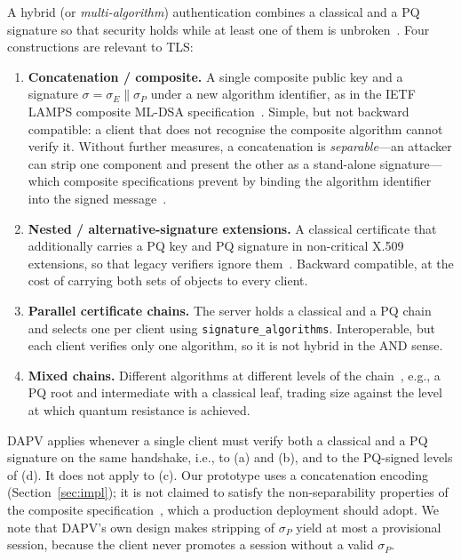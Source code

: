 \documentclass[preprint,10pt,3p]{elsarticle}
\begin{document}
A hybrid (or \emph{multi-algorithm}) authentication combines a classical
and a PQ signature so that security holds while at least one of them is
unbroken~\cite{Bindel2017,BindelHale2023,HybridSpectrums}.  Four
constructions are relevant to TLS:
\begin{enumerate}[label=(\alph*), leftmargin=*]
\item \textbf{Concatenation / composite.}  A single composite public key
  and a signature $\sigma = \sigma_E \| \sigma_P$ under a new algorithm
  identifier, as in the IETF LAMPS composite ML-DSA
  specification~\cite{CompositeSigs}.  Simple, but not backward compatible:
  a client that does not recognise the composite algorithm cannot verify
  it.  Without further measures, a concatenation is \emph{separable}---an
  attacker can strip one component and present the other as a stand-alone
  signature---which composite specifications prevent by binding the
  algorithm identifier into the signed message~\cite{BindelHale2023,CompositeSigs}.
\item \textbf{Nested / alternative-signature extensions.}  A classical
  certificate that additionally carries a PQ key and PQ signature in
  non-critical X.509 extensions, so that legacy verifiers ignore
  them~\cite{Bindel2017}.  Backward compatible, at the cost of carrying
  both sets of objects to every client.
\item \textbf{Parallel certificate chains.}  The server holds a classical
  and a PQ chain and selects one per client using
  \texttt{signature\_algorithms}.  Interoperable, but each client verifies
  only one algorithm, so it is not hybrid in the AND sense.
\item \textbf{Mixed chains.}  Different algorithms at different levels of
  the chain~\cite{Paul2022}, e.g., a PQ root and intermediate with a
  classical leaf, trading size against the level at which quantum
  resistance is achieved.
\end{enumerate}
DAPV applies whenever a single client must verify both a classical and a
PQ signature on the same handshake, i.e., to (a) and (b), and to the
PQ-signed levels of (d).  It does not apply to (c).  Our prototype uses a
concatenation encoding (Section~\ref{sec:impl}); it is not claimed to
satisfy the non-separability properties of the composite
specification~\cite{CompositeSigs}, which a production deployment should
adopt.  We note that DAPV's own design makes stripping of $\sigma_P$ yield
at most a provisional session, because the client never promotes a
session without a valid $\sigma_P$.
\end{document}
